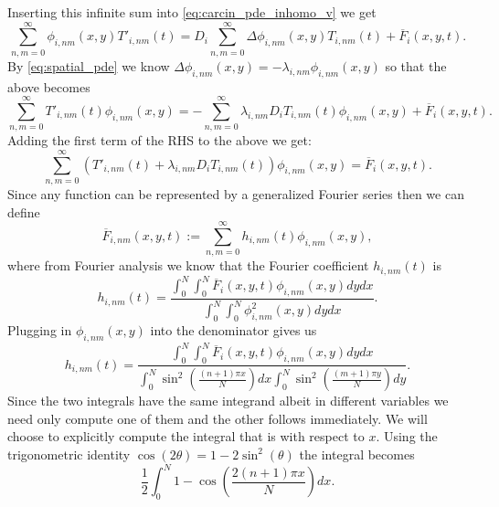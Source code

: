 \documentclass[\main/thesis.tex]{subfiles}
\begin{document}
Inserting this infinite sum into \eqref{eq:carcin_pde_inhomo_v} we get
\begin{equation*}
\sum_{n,m {=} 0}^{\infty} \phi_{i,nm}(x, y)T'_{i,nm}(t) {=} D_i \sum_{n,m {=} 0}^{\infty} \Delta \phi_{i,nm}(x, y) T_{i,nm}(t) {+} \overline{F}_i(x, y, t).
\end{equation*}
By \eqref{eq:spatial_pde} we know $\Delta \phi_{i,nm}(x, y) {=} \minus \lambda_{i,nm} \phi_{i,nm}(x, y)$ so that the above becomes
\begin{equation*}
\sum_{n,m{=}0}^{\infty} T'_{i,nm}(t) \phi_{i,nm}(x, y) = {-}\sum_{n,m{=}0}^{\infty} \lambda_{i,nm} D_i T_{i,nm}(t) \phi_{i,nm}(x, y) {+} \overline{F}_i(x, y, t).
\end{equation*}
Adding the first term of the RHS to the above we get:
\begin{equation}
\sum_{n,m{=}0}^{\infty} \left( T'_{i,nm}(t) {+} \lambda_{i,nm} D_i T_{i,nm}(t) \right)\phi_{i,nm}(x, y) {=} \overline{F}_i(x, y, t).
\label{eq:time_source_relation}
\end{equation} 
Since any function can be represented by a generalized Fourier series then we can define
\begin{equation*}
\overline{F}_{i,nm}(x, y, t) {:=} \sum_{n,m{=}0}^{\infty} h_{i,nm}(t) \phi_{i,nm}(x, y),
\end{equation*}
where from Fourier analysis we know that the Fourier coefficient $h_{i,nm}(t)$ is
\begin{equation*}
h_{i,nm}(t) {=} \frac{\int_{0}^{N} \int_{0}^{N} \overline{F}_i(x, y, t) \phi_{i,nm}(x, y) dy dx}{\int_{0}^{N} \int_{0}^{N} \phi_{i,nm}^2(x, y) dy dx}.
\end{equation*}
Plugging in $\phi_{i,nm}(x, y)$ into the denominator gives us
\begin{equation*}
h_{i,nm}(t) {=}
\frac{\int_{0}^{N} \int_{0}^{N} \overline{F}_i(x, y, t) \phi_{i,nm}(x, y) dy dx}{\int_{0}^{N} \sin^2\left( \frac{(n+1)\pi x}{N} \right) dx \int_{0}^{N} \sin^2\left( \frac{(m+1)\pi y}{N} \right) dy}.
\end{equation*}
Since the two integrals have the same integrand albeit in different variables we need only compute one of them and the other follows immediately. We will choose to explicitly compute the integral that 
is with respect to $x$. Using the trigonometric identity $\cos(2 \theta) {=} 1 {-} 2\sin^2(\theta)$ the integral becomes
\begin{equation*}
\frac{1}{2} \int_{0}^{N} 1 {-} \cos \left( \frac{2(n+1)\pi x}{N} \right) dx.
\end{equation*} 
\end{document}
